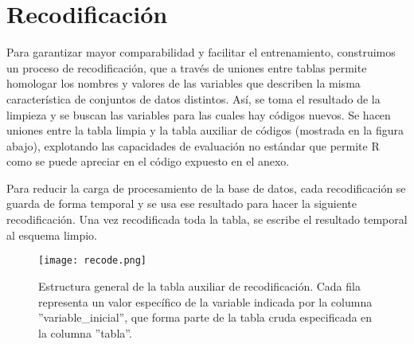 \section*{Recodificación}
Para garantizar mayor comparabilidad y facilitar el entrenamiento, construimos un proceso de recodificación, que a través de uniones entre tablas permite homologar los nombres y valores de las variables que describen la misma característica de conjuntos de datos distintos. Así, se toma el resultado de la limpieza y se buscan las variables para las cuales hay códigos nuevos. Se hacen uniones entre la tabla limpia y la tabla auxiliar de códigos (mostrada en la figura abajo), explotando las capacidades de evaluación no estándar que permite R como se puede apreciar en el código expuesto en el anexo.
\par
\noindent
Para reducir la carga de procesamiento de la base de datos, cada recodificación se guarda de forma temporal y se usa ese resultado para hacer la siguiente recodificación. Una vez recodificada toda la tabla, se escribe el resultado temporal al esquema limpio.
\begin{figure}[h]
    \caption{Estructura general de la tabla auxiliar de recodificación. Cada fila representa un valor específico de la variable indicada por la columna ''variable\_inicial'', que forma parte de la tabla cruda especificada en la columna ''tabla''.}
    \centering
    \texttt{[image: recode.png]}
\end{figure}
